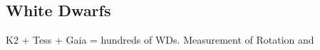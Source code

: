 {\color{red} \subsection{White Dwarfs}}
K2 + Tess + Gaia = hundreds of WDs. Measurement of Rotation and  